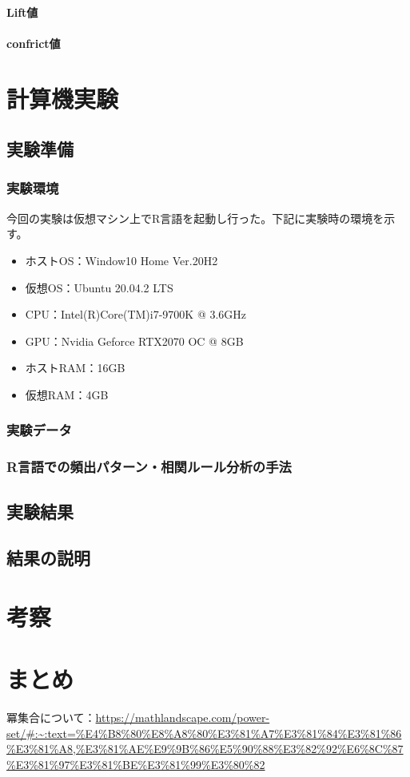 \documentclass[dvipdfmx]{jsarticle}
\begin{document}
\paragraph{Lift値}
\paragraph{confrict値}



\section{計算機実験}
\subsection{実験準備}
  \subsubsection{実験環境}
  今回の実験は仮想マシン上でR言語を起動し行った。下記に実験時の環境を示す。
  \begin{itemize}
    \item ホストOS：Window10 Home Ver.20H2
    \item 仮想OS：Ubuntu 20.04.2 LTS
    \item CPU：Intel(R)Core(TM)i7-9700K @ 3.6GHz
    \item GPU：Nvidia Geforce RTX2070 OC @ 8GB
    \item ホストRAM：16GB
    \item 仮想RAM：4GB
  \end{itemize}
\subsubsection{実験データ}
\subsubsection{R言語での頻出パターン・相関ルール分析の手法}
\subsection{実験結果}
\subsection{結果の説明}

\section{考察}
\section{まとめ}

\begin{thebibliography}{99}
  \bibitem 冪集合について：\url{https://mathlandscape.com/power-set/#:~:text=%E4%B8%80%E8%A8%80%E3%81%A7%E3%81%84%E3%81%86%E3%81%A8,%E3%81%AE%E9%9B%86%E5%90%88%E3%82%92%E6%8C%87%E3%81%97%E3%81%BE%E3%81%99%E3%80%82}
\end{thebibliography}
\end{document}
